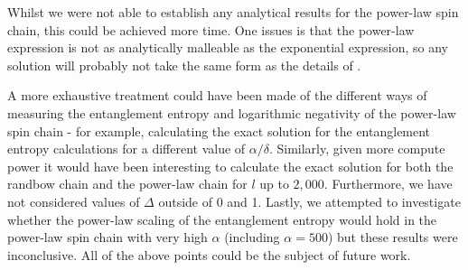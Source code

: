 Whilst we were not able to establish any analytical results for the power-law spin chain, this could be achieved more time. One issues is that the power-law expression is not as analytically malleable as the exponential expression, so any solution will probably not take the same form as the details of \cite{paola2018}.


A more exhaustive treatment could have been made of the different ways of measuring the entanglement entropy and logarithmic negativity of the power-law spin chain - for example, calculating the exact solution for the entanglement entropy calculations for a different value of $\alpha / \delta$. Similarly, given more compute power it would have been interesting to calculate the exact solution for both the randbow chain and the power-law chain for $l$ up to $2,000$. Furthermore, we have not considered values of $\Delta$ outside of 0 and 1. Lastly, we attempted to investigate whether the power-law scaling of the entanglement entropy would hold in the power-law spin chain with very high $\alpha$ (including $\alpha = 500$) but these results were inconclusive. All of the above points could be the subject of future work.



